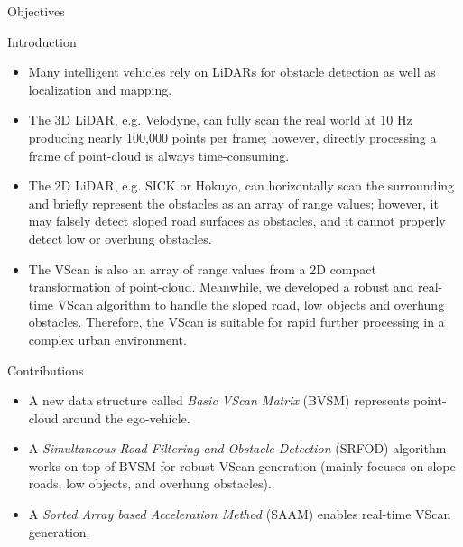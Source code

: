 \documentclass[final,hyperref={pdfpagelabels=false}]{beamer}
\begin{document}
\begin{frame}[t]
\begin{columns}[t]
\begin{column}{0.47\textwidth}
\begin{block}{Objectives}
\end{block}

            
\begin{block}{Introduction}

\begin{itemize}
\item Many intelligent vehicles rely on LiDARs for obstacle detection as well as localization and mapping.
\item The 3D LiDAR, e.g. Velodyne, can fully scan the real world at 10 Hz producing nearly 100,000 points per frame; however, directly processing a frame of point-cloud is always time-consuming.
\item The 2D LiDAR, e.g. SICK or Hokuyo, can horizontally scan the surrounding and briefly represent the obstacles as an array of range values; however, it may falsely detect sloped road surfaces as obstacles, and it cannot properly detect low or overhung obstacles.
\item The VScan is also an array of range values from a 2D compact transformation of point-cloud. Meanwhile, we developed a robust and real-time VScan algorithm to handle the sloped road, low objects and overhung obstacles. Therefore, the VScan is suitable for rapid further processing in a complex urban environment.
\end{itemize}

\end{block}

\begin{block}{Contributions}

\begin{itemize}
	\item A new data structure called \textit{Basic VScan Matrix} (BVSM) represents point-cloud around the ego-vehicle.
	\item A \textit{Simultaneous Road Filtering and Obstacle Detection} (SRFOD) algorithm works on top of BVSM for robust VScan generation (mainly focuses on slope roads, low objects, and overhung obstacles).
	\item A \textit{Sorted Array based Acceleration Method} (SAAM) enables real-time VScan generation.
\end{itemize}

\end{block}


\end{column}
\end{columns}
\end{frame}
\end{document}
